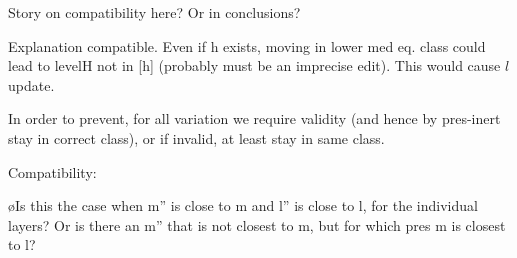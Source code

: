 Story on compatibility here? Or in conclusions?

Explanation compatible. Even if h exists, moving in lower med eq. class could lead to levelH not in [h] (probably must be an imprecise edit). This would cause $l$ update. 

In order to prevent, for all variation we require validity (and hence by pres-inert stay in correct class), or if invalid, at least stay in same class.


Compatibility:
%
%
%







\bl
\o Is this the case when m'' is close to m and l'' is close to l, for the individual layers? Or is there an m'' that is not closest to m, but for which pres m is closest to l?
\el






